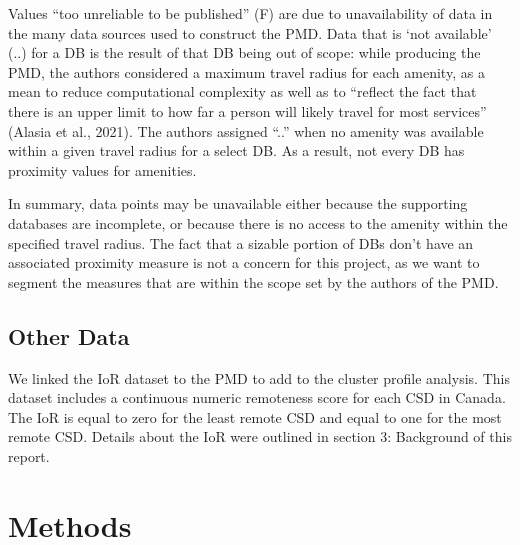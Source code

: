 \documentclass[11pt, a4paper]{article}
\begin{document}
Values ``too unreliable to be published'' (F) are due to unavailability of data in the many data sources used to construct the PMD. Data that is `not available' (..) for a DB is the result of that DB being out of scope: while producing the PMD, the authors considered a maximum travel radius for each amenity, as a mean to reduce computational complexity as well as to ``reflect the fact that there is an upper limit to how far a person will likely travel for most services'' (Alasia et al., 2021). The authors assigned ``..'' when no amenity was available within a given travel radius for a select DB. As a result, not every DB has proximity values for amenities.
\par
In summary, data points may be unavailable either because the supporting databases are incomplete, or because there is no access to the amenity within the specified travel radius. The fact that a sizable portion of DBs don't have an associated proximity measure is not a concern for this project, as we want to segment the measures that are within the scope set by the authors of the PMD.








\subsection{Other Data}


We linked the IoR dataset to the PMD to add to the cluster profile analysis. This dataset includes a continuous numeric remoteness score for each CSD in Canada. The IoR is equal to zero for the least remote CSD and equal to one for the most remote CSD. Details about the IoR were outlined in section 3: Background of this report.









\section{Methods}
\end{document}
